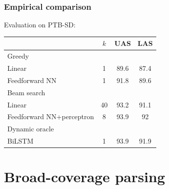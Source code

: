 \documentclass[t]{beamer}
\begin{document}
\begin{frame}
    \frametitle{Empirical comparison}
    Evaluation on PTB-SD:
    \begin{center}
    \begin{tabular}{l|c|cc}
    & $k$ & UAS & LAS \\ \hline
    Greedy \\
    Linear \cite{ZhangTDP11} & 1 & 89.6 & 87.4 \\
    Feedforward NN \cite{chen2014fast} & 1 & 91.8 & 89.6 \\
    \hline
    Beam search \\
    Linear \cite{bohnet2012transition} & 40 & 93.2 & 91.1 \\
    Feedforward NN+perceptron \cite{weiss2015structured} & 8 & 93.9 & 92 \\
    \hline
    Dynamic oracle \\
    BiLSTM \cite{kiperwasser2016simple} & 1 & 93.9 & 91.9 \\
    \end{tabular}
    \end{center}
\end{frame}



\section{Broad-coverage parsing}
\end{document}
